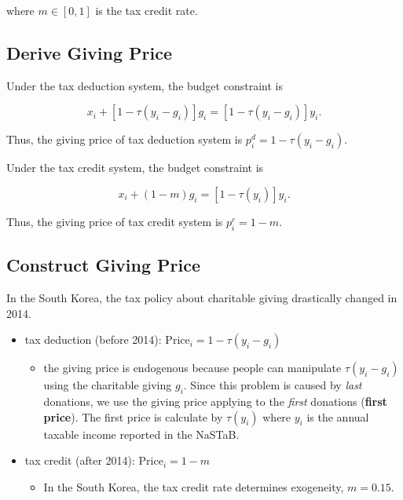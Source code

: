 \documentclass[ review  , 3p ]{elsarticle}
\providecommand{\tightlist}{%
  \setlength{\itemsep}{0pt}\setlength{\parskip}{0pt}}
\begin{document}
  where \(m \in [0, 1]\) is the tax credit rate.
  
  \hypertarget{derive-giving-price}{%
  \subsection{Derive Giving Price}\label{derive-giving-price}}
  
  Under the tax deduction system, the budget constraint is
  
  \[
      x_i + [1 - \tau(y_i - g_i)]g_i = [1 - \tau(y_i - g_i)] y_i.
  \]
  
  Thus, the giving price of tax deduction system is \(p_i^{d} = 1 - \tau(y_i - g_i)\).
  
  Under the tax credit system, the budget constraint is
  
  \[
      x_i + (1 - m) g_i = [1 - \tau(y_i)] y_i.
  \]
  
  Thus, the giving price of tax credit system is \(p_i^c = 1 - m\).
  
  \hypertarget{construct-giving-price}{%
  \subsection{Construct Giving Price}\label{construct-giving-price}}
  
  In the South Korea, the tax policy about charitable giving drastically changed in 2014.
  
  \begin{itemize}
  \tightlist
  \item
    tax deduction (before 2014): \(\text{Price}_i = 1 - \tau(y_i - g_i)\)
  
    \begin{itemize}
    \tightlist
    \item
      the giving price is endogenous because people can manipulate \(\tau(y_i - g_i)\) using the charitable giving \(g_i\). Since this problem is caused by \emph{last} donations, we use the giving price applying to the \emph{first} donations (\textbf{first price}). The first price is calculate by \(\tau(y_i)\) where \(y_i\) is the annual taxable income reported in the NaSTaB.
    \end{itemize}
  \item
    tax credit (after 2014): \(\text{Price}_i = 1 - m\)
  
    \begin{itemize}
    \tightlist
    \item
      In the South Korea, the tax credit rate determines exogeneity, \(m = 0.15\).
    \end{itemize}
  \end{itemize}
  
\end{document}

